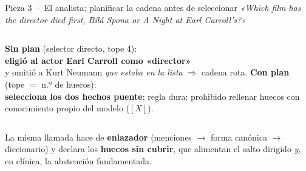 \documentclass[aspectratio=169,10pt]{beamer}
\newcommand{\bien}[1]{\textcolor{verde}{\textbf{#1}}}
\newcommand{\mal}[1]{\textcolor{teja}{\textbf{#1}}}
\begin{document}
\begin{frame}{Pieza 3 · El analista: planificar la cadena antes de seleccionar}
\footnotesize
\emph{«Which film has the director died first, Bílá Spona or A Night at Earl Carroll's?»}
\centering
{}

\vspace{1.5mm}
\begin{columns}[T]
\textbf{Sin plan} (selector directo, tope 4):\\
\mal{eligió al actor Earl Carroll como «director»}\\ y omitió a Kurt Neumann
\emph{que estaba en la lista} $\Rightarrow$ cadena rota.
\textbf{Con plan} (tope $=$ n.º de huecos):\\
\bien{selecciona los dos hechos puente}; regla dura:
prohibido rellenar huecos con conocimiento propio del modelo ($[X]$).
\end{columns}
\vspace{1.5mm}
La misma llamada hace de \textbf{enlazador} (menciones $\to$ forma canónica $\to$ diccionario)
y declara los \textbf{huecos sin cubrir}, que alimentan el salto dirigido
\emph{y}, en clínica, la abstención fundamentada.
\end{frame}
\end{document}
